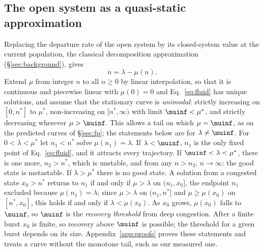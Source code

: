 \subsection{The open system as a quasi-static approximation}\label{sec:fluid}
Replacing the departure rate of the open system by its closed-system value at the current population, the classical decomposition approximation (\S\ref{sec:background}), gives
\begin{equation}\label{eq:fluid}
\dot n=\lambda-\mu(n).
\end{equation}
Extend $\mu$ from integer $n$ to all $n\ge0$ by linear interpolation, so that it is continuous and piecewise linear with $\mu(0)=0$ and Eq.~\eqref{eq:fluid} has unique solutions, and assume that the stationary curve is \emph{unimodal}: strictly increasing on $[0,n^*]$ to $\mu^*$, non-increasing on $[n^*,\infty)$ with limit $\muinf<\mu^*$, and strictly decreasing wherever $\mu>\muinf$. This allows a tail on which $\mu=\muinf$, as on the predicted curves of \S\ref{sec:fp}; the statements below are for $\lambda\ne\muinf$. For $0<\lambda<\mu^*$ let $n_1<n^*$ solve $\mu(n_1)=\lambda$. If $\lambda<\muinf$, $n_1$ is the only fixed point of Eq.~\eqref{eq:fluid}, and it attracts every trajectory. If $\muinf<\lambda<\mu^*$, there is one more, $n_2>n^*$, which is unstable, and from any $n>n_2$, $n\to\infty$: the good state is metastable. If $\lambda>\mu^*$ there is no good state. A solution from a congested state $x_0>n^*$ returns to $n_1$ if and only if $\mu>\lambda$ on $(n_1,x_0]$, the endpoint $n_1$ excluded because $\mu(n_1)=\lambda$; since $\mu>\lambda$ on $(n_1,n^*]$ and $\mu\ge\mu(x_0)$ on $[n^*,x_0]$, this holds if and only if $\lambda<\mu(x_0)$. As $x_0$ grows, $\mu(x_0)$ falls to $\muinf$, so $\muinf$ is the \emph{recovery threshold} from deep congestion. After a finite burst $x_0$ is finite, so recovery above $\muinf$ is possible; the threshold for a given burst depends on its size. Appendix~\ref{app:proofs} proves these statements and treats a curve without the monotone tail, such as our measured one.

